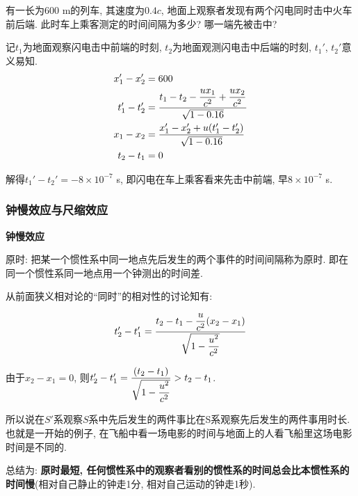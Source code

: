\begin{example}
	有一长为600 m的列车, 其速度为$0.4c$, 地面上观察者发现有两个闪电同时击中火车前后端. 此时车上乘客测定的时间间隔为多少? 哪一端先被击中? 
	
	\begin{solution}
		
		记$t_1$为地面观察闪电击中前端的时刻, $t_2$为地面观测闪电击中后端的时刻, $t_1'$, $t_2'$意义易知.
		\begin{align*}
			x_1' - x_2' &= 600 \\
			t_1' - t_2' &= \dfrac{t_1 - t_2 - \dfrac{u x_1}{c^2} + \dfrac{u x_2}{c^2}}{\sqrt{1-0.16}} \\
			x_1 - x_2 &= \dfrac{x_1' - x_2' + u\qty(t_1' - t_2')}{\sqrt{1 - 0.16}} \\
			t_2 - t_1 &= 0
		\end{align*}
		
		解得$t_1' - t_2' = -8 \times 10^{-7}$ s, 即闪电在车上乘客看来先击中前端, 早$8 \times 10^{-7}$ s. 
		
	\end{solution}
	
\end{example}

\subsubsection{钟慢效应与尺缩效应}

\noindent \textbf{钟慢效应}

原时: 把某一个惯性系中同一地点先后发生的两个事件的时间间隔称为原时. 即在同一个惯性系同一地点用一个钟测出的时间差. 

从前面狭义相对论的“同时”的相对性的讨论知有: 

\begin{equation}
	t_2' - t_1' = \dfrac{t_2 - t_1 - \dfrac{u}{c^2} \qty(x_2 - x_1)}{\sqrt{1 - \dfrac{u^2}{c^2}}} \label{C6-eq18}
\end{equation}

由于$x_2 - x_1 = 0$, 则$t_2' - t_1' = \dfrac{\qty(t_2 - t_1)}{\sqrt{1 - \dfrac{u^2}{c^2}}} > t_2 - t_1$. 

所以说在$S'$系观察$S$系中先后发生的两件事比在S系观察先后发生的两件事用时长. 也就是一开始的例子, 在飞船中看一场电影的时间与地面上的人看飞船里这场电影时间是不同的. 

总结为: \textbf{原时最短, 任何惯性系中的观察者看别的惯性系的时间总会比本惯性系的时间慢}(相对自己静止的钟走1分, 相对自己运动的钟走1秒). 

\vskip 0.3cm

